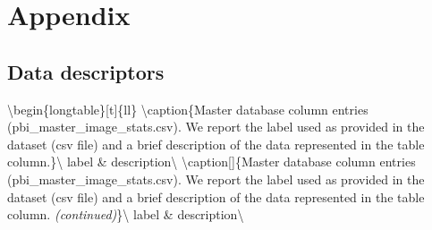 \documentclass[
  landscape]{article}
\author{}
\date{\vspace{-2.5em}}
\begin{document}
\hypertarget{appendix}{%
\section{Appendix}\label{appendix}}

\hypertarget{data-descriptors}{%
\subsection{Data descriptors}\label{data-descriptors}}

\textbackslash begin\{longtable\}{[}t{]}\{ll\}
\textbackslash caption\{\label{tab:unnamed-chunk-1}Master database
column entries (pbi\_master\_image\_stats.csv). We report the label used
as provided in the dataset (csv file) and a brief description of the
data represented in the table column.\}\textbackslash{} \toprule label
\& description\textbackslash{} \midrule \endfirsthead
\textbackslash caption{[}{]}\{Master database column entries
(pbi\_master\_image\_stats.csv). We report the label used as provided in
the dataset (csv file) and a brief description of the data represented
in the table column. \textit{(continued)}\}\textbackslash{} \toprule
label \& description\textbackslash{} \midrule \endhead

\endfoot
\bottomrule
\endlastfoot
\end{document}
